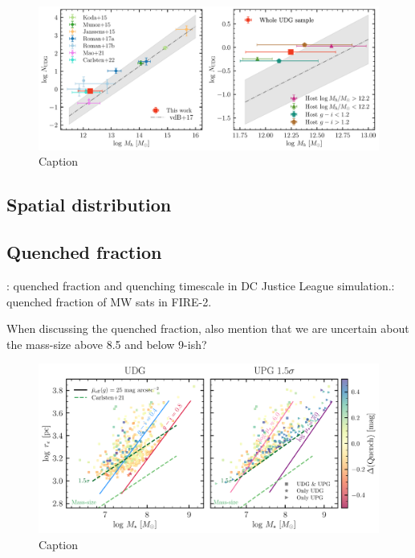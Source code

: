\documentclass[twocolumn,astrosymb,twocolappendix]{aastex631}
\begin{document}
\begin{CJK*}{UTF8}{gbsn}
\begin{figure}
	\vbox{ 
		\centering
		\includegraphics[width=1\linewidth]{N_UDG_host_mass.pdf}
	}
    \caption{Caption}
    \label{fig:n_udg}
\end{figure}

\subsection{Spatial distribution}

\subsection{Quenched fraction}\label{sec:quench}

\citep{Baxter2021}

\citep{Akins2021}: quenched fraction and quenching timescale in DC Justice League simulation.\citep{Samuel2022}: quenched fraction of MW sats in FIRE-2.

When discussing the quenched fraction, also mention that we are uncertain about the mass-size above 8.5 and below 9-ish? 

\begin{figure}
	\vbox{ 
		\centering
		\includegraphics[width=1\linewidth]{mass_size_plane.pdf}
	}
    \caption{Caption}
    \label{fig:mass_size}
\end{figure}


\end{CJK*}
\end{document}
